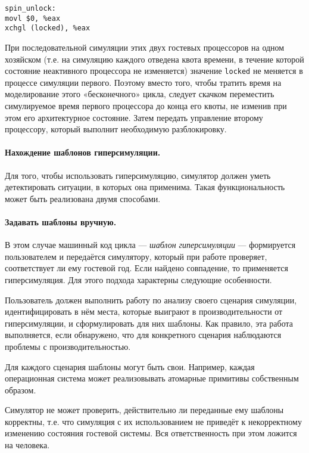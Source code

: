 \begin{lstlisting}
spin_unlock:
movl $0, %eax
xchgl (locked), %eax
\end{lstlisting}

При последовательной симуляции этих двух гостевых процессоров на одном хозяйском (т.е. на симуляцию каждого отведена квота времени, в течение которой состояние неактивного процессора не изменяется) значение \texttt{locked} не меняется в процессе симуляции первого. Поэтому вместо того, чтобы тратить время на моделирование этого «бесконечного» цикла, следует скачком переместить симулируемое время первого процессора до конца его квоты, не изменив при этом его архитектурное состояние. Затем передать управление второму процессору, который выполнит необходимую разблокировку.

\paragraph{Нахождение шаблонов гиперсимуляции.} Для того, чтобы использовать гиперсимуляцию, симулятор должен уметь детектировать ситуации, в которых она применима. Такая функциональность может быть реализована двумя способами.

\paragraph{Задавать шаблоны вручную.} В этом случае машинный код цикла — \emph{шаблон гиперсимуляции} — формируется пользователем и передаётся симулятору, который при работе проверяет, соответствует ли ему гостевой год. Если найдено совпадение, то применяется гиперсимуляция. Для этого подхода характерны следующие особенности.

\begin{itemize*}
    \item Пользователь должен выполнить работу по анализу своего сценария симуляции, идентифицировать в нём места, которые выиграют в производительности от гиперсимуляции, и сформулировать для них шаблоны. Как правило, эта работа выполняется, если обнаружено, что для конкретного сценария наблюдаются проблемы с производительностью. 
    \item Для каждого сценария шаблоны могут быть свои. Например, каждая операционная система может реализовывать атомарные примитивы собственным образом.
    \item Симулятор не может проверить, действительно ли переданные ему шаблоны корректны, т.е. что симуляция с их использованием не приведёт к некорректному изменению состояния гостевой системы. Вся ответственность при этом ложится на человека.
\end{itemize*}

